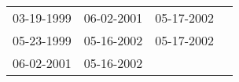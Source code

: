 \begin{supertabular}{llll}
 03-19-1999 &  06-02-2001 &  05-17-2002 \\
 05-23-1999 &  05-16-2002 &  05-17-2002 \\
 06-02-2001 &  05-16-2002 &             \\
\end{supertabular}
